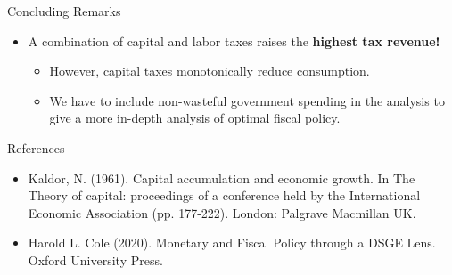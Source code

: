 \documentclass[10pt,c,aspectratio=1610,handout]{beamer}
\begin{document}
\begin{frame}{Concluding Remarks}
\begin{itemize}
\begin{itemize}
    \end{itemize}%
    \vspace*{0.1in}%
    \pause%
    \item[$\blacktriangleright$] A combination of capital and labor taxes raises the \textbf{highest tax revenue!}%
    \begin{itemize}%
      \item[$\rightarrow$] However, capital taxes monotonically reduce consumption.%
      \item[$\rightarrow$] We have to include non-wasteful government spending in the analysis to give a more in-depth analysis of optimal fiscal policy.%
    \end{itemize}%
  \end{itemize}%
  \vspace*{-0.1in}%
\end{frame}%
\begin{frame}{References}%
  \begin{footnotesize}%
    \begin{itemize}%
      \item[$\blacktriangleright$] Kaldor, N. (1961). Capital accumulation and economic growth. In The Theory of capital: proceedings of a conference held by the International Economic Association (pp. 177-222). London: Palgrave Macmillan UK.%
      \item[$\blacktriangleright$] Harold L. Cole (2020). Monetary and Fiscal Policy through a DSGE Lens. Oxford University Press.%
    \end{itemize}%
  \end{footnotesize}%
\end{frame}%
\end{document}
